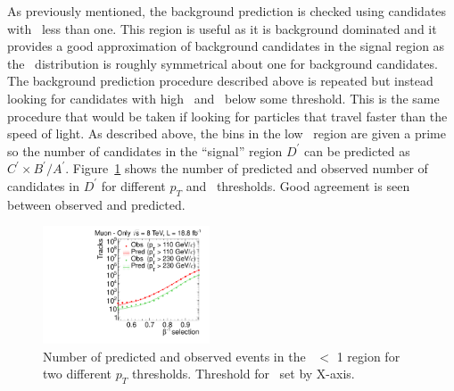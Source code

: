 As previously mentioned, the background prediction is checked using candidates with \invbeta\ less than one. This region is useful as it is background dominated
and it provides a good approximation of background candidates in the signal region as the \invbeta\ distribution is roughly symmetrical about one for background candidates.
The background prediction procedure described above is repeated but instead looking for candidates with high \pt\ and \invbeta\ below some threshold.
This is the same procedure that would be taken if looking for particles that travel faster than the speed of light.
As described above, the bins in the low \invbeta\ region are given a prime so the number of candidates in the ``signal'' region $D^{\prime}$ can be predicted as
$C^{\prime} \times B^{\prime}/A^{\prime}$. Figure~\ref{fig:PredFlipPt230} shows the number of predicted and observed number of candidates in $D^{\prime}$ for different $p_T$
and \invbeta\ thresholds. Good agreement is seen between observed and predicted. 

\begin{figure}
\centering
  \includegraphics[clip=true, trim=0.0cm 0cm 2.8cm 0cm, width=0.44\textwidth]{figures/muonly/Prediction_Data8TeV_NPredVsNObs_Flip}
  \caption[Number of predicted and observed events in the \invbeta\ $<$ 1 region in the \muononly\ analysis]
{Number of predicted and observed events in the \invbeta\ $<$ 1 region for two different $p_T$ thresholds. Threshold for \invbeta\ set by X-axis.}
    \label{fig:PredFlipPt230}
\end{figure}

